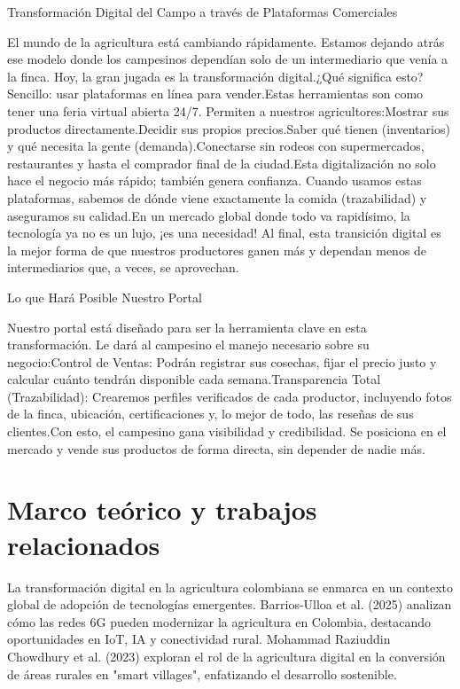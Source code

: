 Transformación Digital del Campo a través de Plataformas Comerciales

El mundo de la agricultura está cambiando rápidamente. Estamos dejando atrás ese modelo donde los campesinos dependían solo de un intermediario que venía a la finca. Hoy, la gran jugada es la transformación digital.¿Qué significa esto? Sencillo: usar plataformas en línea para vender.Estas herramientas son como tener una feria virtual abierta 24/7. Permiten a nuestros agricultores:Mostrar sus productos directamente.Decidir sus propios precios.Saber qué tienen (inventarios) y qué necesita la gente (demanda).Conectarse sin rodeos con supermercados, restaurantes y hasta el comprador final de la ciudad.Esta digitalización no solo hace el negocio más rápido; también genera confianza. Cuando usamos estas plataformas, sabemos de dónde viene exactamente la comida (trazabilidad) y aseguramos su calidad.En un mercado global donde todo va rapidísimo, la tecnología ya no es un lujo, ¡es una necesidad! Al final, esta transición digital es la mejor forma de que nuestros productores ganen más y dependan menos de intermediarios que, a veces, se aprovechan.

Lo que Hará Posible Nuestro Portal

Nuestro portal está diseñado para ser la herramienta clave en esta transformación. Le dará al campesino el manejo necesario sobre su negocio:Control de Ventas: Podrán registrar sus cosechas, fijar el precio justo y calcular cuánto tendrán disponible cada semana.Transparencia Total (Trazabilidad): Crearemos perfiles verificados de cada productor, incluyendo fotos de la finca, ubicación, certificaciones y, lo mejor de todo, las reseñas de sus clientes.Con esto, el campesino gana visibilidad y credibilidad. Se posiciona en el mercado y vende sus productos de forma directa, sin depender de nadie más.

\section{Marco teórico y trabajos relacionados}

La transformación digital en la agricultura colombiana se enmarca en un contexto global de adopción de tecnologías emergentes. Barrios-Ulloa et al. (2025) analizan cómo las redes 6G pueden modernizar la agricultura en Colombia, destacando oportunidades en IoT, IA y conectividad rural. Mohammad Raziuddin Chowdhury et al. (2023) exploran el rol de la agricultura digital en la conversión de áreas rurales en "smart villages", enfatizando el desarrollo sostenible.

